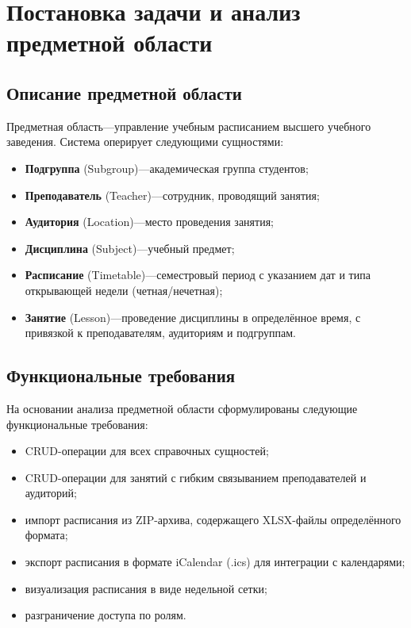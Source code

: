 \chapter{Постановка задачи и анализ предметной области}
\label{cha:analysis}

\section{Описание предметной области}

Предметная область---управление учебным расписанием высшего учебного заведения. Система оперирует следующими сущностями:

\begin{itemize}
\item \textbf{Подгруппа} (Subgroup)---академическая группа студентов;
\item \textbf{Преподаватель} (Teacher)---сотрудник, проводящий занятия;
\item \textbf{Аудитория} (Location)---место проведения занятия;
\item \textbf{Дисциплина} (Subject)---учебный предмет;
\item \textbf{Расписание} (Timetable)---семестровый период с указанием дат и типа открывающей недели (четная/нечетная);
\item \textbf{Занятие} (Lesson)---проведение дисциплины в определённое время, с привязкой к преподавателям, аудиториям и подгруппам.
\end{itemize}

\section{Функциональные требования}

На основании анализа предметной области сформулированы следующие функциональные требования:

\begin{itemize}
\item CRUD-операции для всех справочных сущностей;
\item CRUD-операции для занятий с гибким связыванием преподавателей и аудиторий;
\item импорт расписания из ZIP-архива, содержащего XLSX-файлы определённого формата;
\item экспорт расписания в формате iCalendar (.ics) для интеграции с календарями;
\item визуализация расписания в виде недельной сетки;
\item разграничение доступа по ролям.
\end{itemize}

